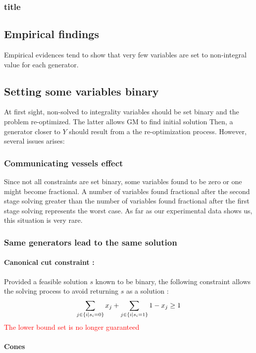\subsubsection*{title}



\subsection{Empirical findings}
Empirical evidences tend to show that very few variables are set to non-integral value for each generator.

\subsection{Setting some variables binary}
At first sight, non-solved to integrality variables should be set binary and the problem re-optimized. The latter allows GM to find initial solution Then, a generator closer to $Y$ should result from a the re-optimization process. However, several issues arises:

\subsubsection{Communicating vessels effect}
Since not all constraints are set binary, some variables found to be zero or one might become fractional. 
A number of variables found fractional after the second stage solving greater than the number of variables found fractional after the first stage solving represents the worst case. 
As far as our experimental data shows us, this situation is very rare.
\subsubsection{Same generators lead to the same solution}
\paragraph{Canonical cut constraint :}
Provided a feasible solution $s$ known to be binary, the following constraint allows the solving process to avoid returning $s$ as a solution \cite{canonical_cut}:
\[
\sum_{j \in \left\lbrace i \mid s_i = 0 \right\rbrace}x_j +  \sum_{j \in \left\lbrace i \mid s_i = 1 \right\rbrace}1-x_j \geq 1
\]
\textcolor{red}{The lower bound set is no longer guaranteed}
\paragraph{Cones}

